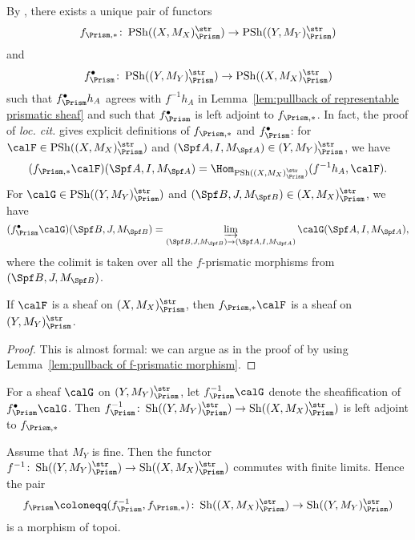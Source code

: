 By \cite[Prop.~5.7]{berthelot-ogus-book}, there exists a unique pair of functors
\[
f_{\Prism,\ast}\colon \operatorname{PSh}((X,M_X)_\Prism^{\str})\rightarrow \operatorname{PSh}((Y,M_Y)_\Prism^{\str})
\]
and
\[
f_\Prism^\bullet\colon \operatorname{PSh}((Y,M_Y)_\Prism^{\str})\rightarrow \operatorname{PSh}((X,M_X)_\Prism^{\str})
\]
such that $f_\Prism^\bullet h_A$ agrees with $f^{-1}h_A$ in Lemma~\ref{lem:pullback of representable prismatic sheaf} and such that $f_\Prism^\bullet$ is left adjoint to $f_{\Prism,\ast}$. In fact, the proof of \textit{loc. cit.} gives explicit definitions of $f_{\Prism,\ast}$ and $f_\Prism^\bullet$:
for $\calF\in \operatorname{PSh}((X,M_X)_\Prism^{\str})$ and $(\Spf A, I, M_{\Spf A})\in (Y,M_Y)_\Prism^{\str}$, we have
\[
(f_{\Prism,\ast}\calF)(\Spf A, I, M_{\Spf A})=\Hom_{\operatorname{PSh}((X,M_X)_\Prism^{\str})}(f^{-1}h_A,\calF).
\]
For 
$\calG\in \operatorname{PSh}((Y,M_Y)_\Prism^{\str})$ and $(\Spf B, J, M_{\Spf B})\in (X, M_X)_\Prism^{\str}$, we have
\[
(f_\Prism^\bullet\calG)(\Spf B, J, M_{\Spf B})=\varinjlim_{(\Spf B, J, M_{\Spf B})\rightarrow (\Spf A, I, M_{\Spf A})}\calG(\Spf A, I, M_{\Spf A}),
\]
where the colimit is taken over all the $f$-prismatic morphisms from $(\Spf B, J, M_{\Spf B})$.

\begin{lem}
If $\calF$ is a sheaf on $(X,M_X)_\Prism^{\str}$, then $f_{\Prism,\ast} \calF$ is a sheaf on $(Y,M_Y)_\Prism^{\str}$.
\end{lem}

\begin{proof}
    This is almost formal: we can argue as in the proof of \cite[Prop.~5.8.2]{berthelot-ogus-book} by using Lemma~\ref{lem:pullback of f-prismatic morphism}.
\end{proof}

\begin{defn}
    For a sheaf $\calG$ on $(Y,M_Y)_\Prism^{\str}$, let $f_\Prism^{-1}\calG$ denote the sheafification of $f_\Prism^\bullet\calG$.
    Then $f_\Prism^{-1}\colon \operatorname{Sh}((Y,M_Y)_\Prism^{\str})\rightarrow \operatorname{Sh}((X,M_X)_\Prism^{\str})$ is left adjoint to $f_{\Prism,\ast}$
\end{defn}


\begin{prop}\label{prop:functoriality of log prismatic site}
Assume that $M_Y$ is fine. Then the functor $f^{-1}\colon \operatorname{Sh}((Y,M_Y)_\Prism^{\str})\rightarrow \operatorname{Sh}((X,M_X)_\Prism^{\str})$ commutes with finite limits. Hence the pair 
\[
f_\Prism\coloneqq (f^{-1}_\Prism,f_{\Prism,\ast})\colon \operatorname{Sh}((X,M_X)_\Prism^{\str})\rightarrow\operatorname{Sh}((Y,M_Y)_\Prism^{\str})
\]
is a morphism of topoi. 
\end{prop}

